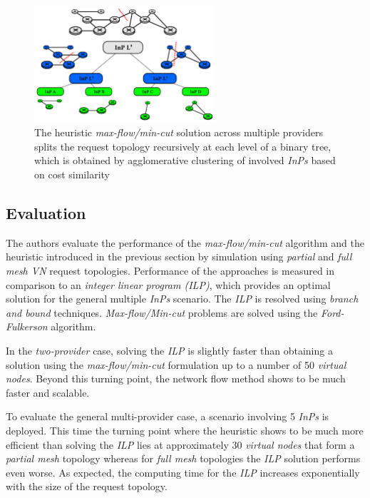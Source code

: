 \documentclass[prodmode,acmtomccap]{acmlarge}
\begin{document}
\begin{figure}[htb]
	\centering
	\includegraphics[width=0.6\textwidth]{recursive_heuristic}
	\caption{The heuristic \emph{max-flow/min-cut} solution across multiple providers splits the request topology recursively at each level of a binary tree, which is obtained 
		by agglomerative clustering of involved \emph{InPs} based on cost similarity}
	\label{fig6}
\end{figure}

\subsection{Evaluation}
The authors evaluate the performance of the \emph{max-flow/min-cut} algorithm and the heuristic introduced in the previous section
by simulation using \emph{partial} and \emph{full mesh VN} request topologies. 
Performance of the approaches is measured in comparison to an \emph{integer linear program (ILP)}, which provides an optimal solution for the general multiple \emph{InPs} scenario.
The \emph{ILP} is resolved using \emph{branch and bound} techniques. \emph{Max-flow/Min-cut} problems are solved using the \emph{Ford-Fulkerson} algorithm.

In the \emph{two-provider} case, solving the \emph{ILP} is slightly faster than obtaining a solution using the \emph{max-flow/min-cut} formulation up to a number of
50 \emph{virtual nodes}. Beyond this turning point, the network flow method shows to be much faster and scalable.

To evaluate the general multi-provider case, a scenario involving 5 \emph{InPs} is deployed. This time the turning point where the heuristic shows to be much more efficient than solving the \emph{ILP}
lies at approximately 30 \emph{virtual nodes} that form a \emph{partial mesh} topology whereas for \emph{full mesh} topologies the \emph{ILP} solution performs even worse.
As expected, the computing time for the \emph{ILP} increases exponentially with the size of the request topology.
\end{document}
